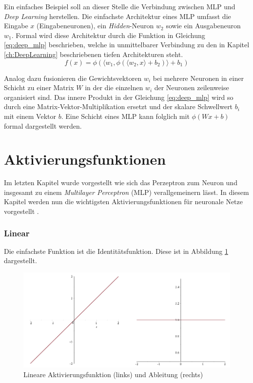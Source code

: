 Ein einfaches Beispiel soll an dieser Stelle die Verbindung zwischen MLP und \textit{Deep Learning} herstellen. Die einfachste Architektur eines MLP umfasst die Eingabe $x$ (Eingabeneuronen), ein \textit{Hidden}-Neuron $w_2$ sowie ein Ausgabeneuron $w_1$. Formal wird diese Architektur durch die Funktion in Gleichung \ref{eq:deep_mlp} beschrieben, welche in unmittelbarer Verbindung zu den in Kapitel \ref{ch:DeepLearning} beschriebenen tiefen Architekturen steht.
\begin{equation}
\label{eq:deep_mlp}
f(x) = \phi(\langle w_1, \phi(\langle w_2, x \rangle + b_2) \rangle + b_1) 
\end{equation}

Analog dazu fusionieren die Gewichtsvektoren $w_i$ bei mehrere Neuronen in einer Schicht zu einer Matrix $ W $ in der die einzelnen $w_i$ der Neuronen zeilenweise organisiert sind. Das innere Produkt in der Gleichung \ref{eq:deep_mlp} wird so durch eine Matrix-Vektor-Multiplikation ersetzt und der skalare Schwellwert $b_i$ mit einem Vektor $b$. Eine Schicht eines MLP kann folglich mit $\phi(Wx + b)$ formal dargestellt werden.

\section{Aktivierungsfunktionen}
\label{ch:aktivierungsfunktonen}
Im letzten Kapitel wurde vorgestellt wie sich das Perzeptron zum Neuron und insgesamt zu einem \textit{Multilayer Perceptron} (MLP) verallgemeinern lässt. In diesem Kapitel werden nun die wichtigsten Aktivierungsfunktionen für neuronale Netze vorgestellt \cite[vgl.][S. 2-17]{Hagan2014}.

\subsubsection{Linear}
Die einfachste Funktion ist die Identitätsfunktion. Diese ist in Abbildung \ref{fig:2_linear} dargestellt.

 \begin{figure}[H]
 \centering
 \includegraphics[width=0.6\linewidth]{images/2_linear}
 \caption[Lineare Aktivierungsfunktion und ihre Ableitung]{Lineare Aktivierungsfunktion (links) und Ableitung (rechts)}
 \label{fig:2_linear}
 \end{figure}

